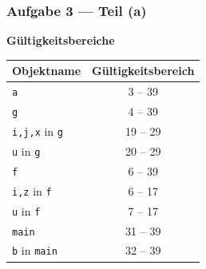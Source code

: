 \documentclass{beamer}
\begin{document}
\begin{frame} \frametitle{Aufgabe 3 --- Teil (a)}
	\textbf{Gültigkeitsbereiche}

	\centering
	\begin{tabular}{|l|c|}
		\hline
		Objektname & Gültigkeitsbereich \\ \hline \hline
		\texttt{a} & 3 -- 39 \\ \hline
		\texttt{g} & 4 -- 39 \\ \hline
		\texttt{i,j,x} in \texttt{g} & 19 -- 29 \\ \hline
		\texttt{u} in \texttt{g} & 20 -- 29 \\ \hline
		\texttt{f} & 6 -- 39 \\ \hline
		\texttt{i,z} in \texttt{f} & 6 -- 17 \\ \hline
		\texttt{u} in \texttt{f} & 7 -- 17 \\ \hline
		\texttt{main} & 31 -- 39 \\ \hline
		\texttt{b} in \texttt{main} & 32 -- 39 \\ \hline
	\end{tabular}
\end{frame}
\end{document}

